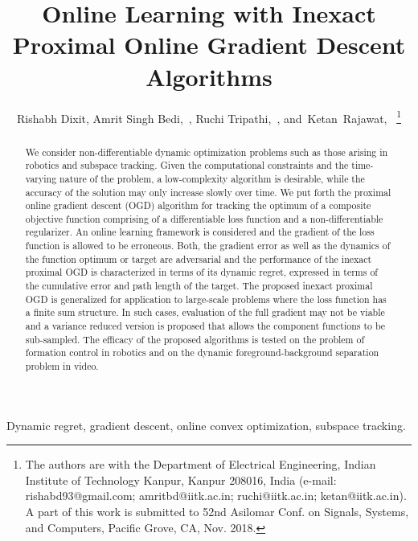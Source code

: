 \documentclass[draftcls,onecolumn,12pt]{IEEEtran}
\title{Online Learning with Inexact Proximal Online Gradient Descent Algorithms
}
\author{Rishabh Dixit,	Amrit Singh Bedi,~\IEEEmembership{Student Member,~IEEE}, Ruchi Tripathi,~\IEEEmembership{Student Member,~IEEE},  
	and~Ketan~Rajawat,~\IEEEmembership{Member,~IEEE}%
	\thanks{
		The authors are with the Department of Electrical Engineering,
		Indian Institute of Technology Kanpur, Kanpur 208016, India (e-mail:
		rishabd93@gmail.com; amritbd@iitk.ac.in; ruchi@iitk.ac.in; ketan@iitk.ac.in). A part \cite{asilomar} of this work is submitted to 52nd Asilomar Conf. on Signals, Systems, and Computers, Pacific Grove, CA, Nov. 2018. }\vspace{-0mm}}
\theoremstyle{plain}
\theoremstyle{plain}
\theoremstyle{remark}
\begin{document}
	

	\maketitle

\begin{abstract}
We consider non-differentiable dynamic optimization problems such as those arising in robotics and subspace tracking. Given the computational constraints and the time-varying nature of the problem, a low-complexity algorithm is desirable, while the accuracy of the solution may only increase slowly over time. We put forth the proximal online gradient descent (OGD) algorithm for tracking the optimum of a composite objective function comprising of a differentiable loss function and a non-differentiable regularizer. An online learning framework is considered and the gradient of the loss function is allowed to be erroneous. Both, the gradient error as well as the dynamics of the function optimum or target are adversarial and the performance of the inexact proximal OGD is characterized in terms of its dynamic regret, expressed in terms of the cumulative error and path length of the target. The proposed inexact proximal OGD is generalized for application to large-scale problems where the loss function has a finite sum structure. In such cases, evaluation of the full gradient may not be viable and a variance reduced version is proposed that allows the component functions to be sub-sampled. The efficacy of the proposed algorithms is tested on the problem of formation control in robotics and on the dynamic foreground-background separation problem in video. 
\end{abstract}

\begin{IEEEkeywords} Dynamic regret, gradient descent, online convex optimization, subspace tracking. 
	\end{IEEEkeywords}
\end{document}
